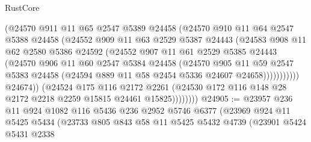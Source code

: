 \begin{lexlean}{RustCore}
\begin{coremodule}
                          (@24570
                            @911
                            @11
                            @65
                            @2547
                            @5389
                            @24458
                            (@24570
                              @910
                              @11
                              @64
                              @2547
                              @5388
                              @24458
                              (@24552
                                @909
                                @11
                                @63
                                @2529
                                @5387
                                @24443
                                (@24583
                                  @908
                                  @11
                                  @62
                                  @2580
                                  @5386
                                  @24592
                                  (@24552
                                    @907
                                    @11
                                    @61
                                    @2529
                                    @5385
                                    @24443
                                    (@24570
                                      @906
                                      @11
                                      @60
                                      @2547
                                      @5384
                                      @24458
                                      (@24570
                                        @905
                                        @11
                                        @59
                                        @2547
                                        @5383
                                        @24458
                                        (@24594 @889 @11 @58 @2454 @5336 @24607 @24658)))))))))))
                    @24674))
                (@24524
                  @175
                  @116
                  @2172
                  @2261
                  (@24530 @172 @116 @148 @28 @2172 @2218 @2259 @15815 @24461 @15825))))))))
@24905 := @23957
    @236
    @11
    @924
    @1082
    @116
    @5436
    @236
    @2952
    @5746
    @6377
    (@23969
      @924
      @11
      @5425
      @5434
      (@23733
        @805
        @843
        @58
        @11
        @5425
        @5432
        @4739
        (@23901
          @5424
          @5431
          @2338

\end{coremodule}
\end{lexlean}
